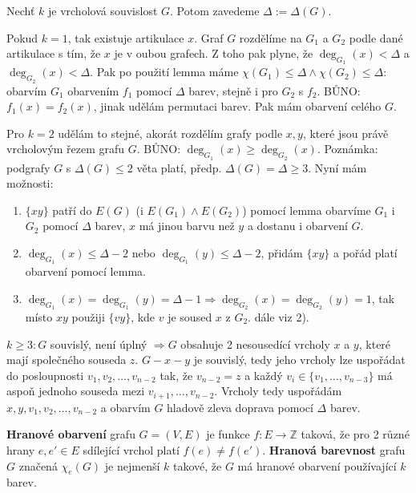 \begin{dukaz}
	Nechť $k$ je vrcholová souvislost $G$. Potom zavedeme $\Delta := \Delta (G)$.
	
	Pokud $k = 1$, tak existuje artikulace $x$. Graf $G$ rozdělíme na $G_{1}$ a $G_{2}$ podle dané artikulace s tím, že $x$ je v oubou grafech. Z toho pak plyne, že $\deg_{G_{1}}(x) < \Delta$ a $\deg_{G_{2}}(x) < \Delta$. Pak po použití lemma máme $\chi(G_{1}) \leq \Delta \land \chi(G_{2}) \leq \Delta:$ obarvím $G_{1}$ obarvením $f_{1}$ pomocí $\Delta$ barev, stejně i pro $G_{2}$ s $f_{2}$. BŮNO: $f_{1}(x) = f_{2}(x)$, jinak udělám permutaci barev. Pak mám obarvení celého $G$.
	
	Pro $k=2$ udělám to stejné, akorát rozdělím grafy podle $x,y$, které jsou právě vrcholovým řezem grafu $G$. BŮNO: $\deg_{G_{1}}(x) \geq \deg_{G_{2}}(x)$. Poznámka: podgrafy $G$ s $\Delta(G) \leq 2$ věta platí, předp. $\Delta(G) = \Delta \geq 3$. Nyní mám možnosti:
	
	\begin{enumerate}
		\item $\{xy\}$ patří do $E(G)$ (i $E(G_{1}) \land E(G_{2})$) pomocí lemma obarvíme $G_{1}$ i $G_{2}$ pomocí $\Delta$ barev, $x$ má jinou barvu než $y$ a dostanu i obarvení $G$.
		\item $\deg_{G_{1}}(x) \leq \Delta - 2$ nebo $\deg_{G_{1}}(y) \leq \Delta - 2$, přidám $\{xy\}$ a pořád platí obarvení pomocí lemma.
		\item $\deg_{G_{1}}(x) = \deg_{G_{1}}(y) = \Delta - 1 \Rightarrow \deg_{G_{2}}(x) = \deg_{G_{2}}(y) = 1$, tak místo $xy$ použiji $\{vy\}$, kde $v$ je soused $x$ z $G_{2}$. dále viz 2).
	\end{enumerate}
	
	$k \geq 3: G$ souvislý, není úplný $\Rightarrow G$ obsahuje 2 nesousedící vrcholy $x$ a $y$, které mají společného souseda $z$. $G - x - y$ je souvislý, tedy jeho vrcholy lze uspořádat do posloupnosti $v_{1},v_{2}, \dots, v_{n-2}$ tak, že $v_{n-2} = z$ a každý $v_{i} \in \{v_{1}, \dots, v_{n-3}\}$ má aspoň jednoho souseda mezi $v_{i+1}, \dots, v_{n-2}$. Vrcholy tedy uspořádám $x,y,v_{1},v_{2},\dots,v_{n-2}$ a obarvím $G$ hladově zleva doprava pomocí $\Delta$ barev.
\end{dukaz}

\begin{definice}
	\textbf{Hranové obarvení} grafu $G = (V,E)$ je funkce $f: E \to \mathbb{Z}$ taková, že pro 2 různé hrany $e, e' \in E$ sdílející vrchol platí $f(e) \neq f(e')$. \textbf{Hranová barevnost} grafu $G$ značená $\chi_{e}(G)$ je nejmenší $k$ takové, že $G$ má hranové obarvení používající $k$ barev.
\end{definice}

